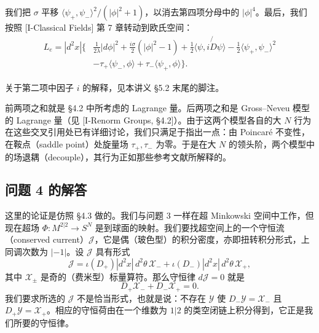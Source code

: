 我们把 $\sigma$ 平移 $\langle\psi_+,\psi_-\rangle^2/(|\phi|^2+1)$，以消去第四项分母中的 $|\phi|^4$。最后，我们按照 [I-Classical Fields] 第 7 章转动到欧氏空间：
\begin{align*}
L_e=|d^2x|\Big\{&\frac{1}{2\lambda}|d\phi|^2+\frac{i\sigma}{2}(|\phi|^2-1)+\frac12\langle\psi,i\not{D}\psi\rangle-\frac12\langle\psi_+,\psi_-\rangle^2\\
&-\tau_+\langle\psi_-,\phi\rangle+\tau_-\langle\psi_+,\phi\rangle\Big\}.
\end{align*}


关于第二项中因子 $i$ 的解释，见本讲义 §5.2 末尾的脚注。

前两项之和就是 §4.2 中所考虑的 Lagrange 量。后两项之和是 Gross–Neveu 模型的 Lagrange 量（见 [I-Renorm Groups, §4.2]）。由于这两个模型各自的大 $N$ 行为在这些交叉引用处已有详细讨论，我们只满足于指出一点：由 Poincaré 不变性，在鞍点（saddle point）处旋量场 $\tau_+,\tau_-$ 为零。于是在大 $N$ 的领头阶，两个模型中的场退耦（decouple），其行为正如那些参考文献所解释的。

\subsection*{问题 4 的解答}

这里的论证是仿照 §4.3 做的。我们与问题 3 一样在超 Minkowski 空间中工作，但现在超场 $\Phi\colon M^{2|2}\to S^N$ 是到球面的映射。我们要找超空间上的一个守恒流（conserved current）$\mathcal{J}$，它是偶（玻色型）的积分密度，亦即扭转积分形式，上同调次数为 $|-1|$。设 $\mathcal{J}$ 具有形式
\[
\mathcal{J}=\iota(D_+)|d^2x|\,d^2\theta\,\mathscr{X}_-
+\iota(D_-)|d^2x|\,d^2\theta\,\mathscr{X}_+ ,
\]
其中 $\mathscr{X}_\pm$ 是奇的（费米型）标量算符。那么守恒律 $d\mathcal{J}=0$ 就是
\[
D_+\mathscr{X}_-+D_-\mathscr{X}_+=0 .
\]
我们要求所选的 $\mathcal{J}$ 不是恰当形式，也就是说：不存在 $\mathcal{Y}$ 使 $D_-\mathcal{Y}=\mathscr{X}_-$ 且 $D_+\mathcal{Y}=\mathscr{X}_+$。相应的守恒荷由在一个维数为 $1|2$ 的类空闭链上积分得到，它正是我们所要的守恒律。

